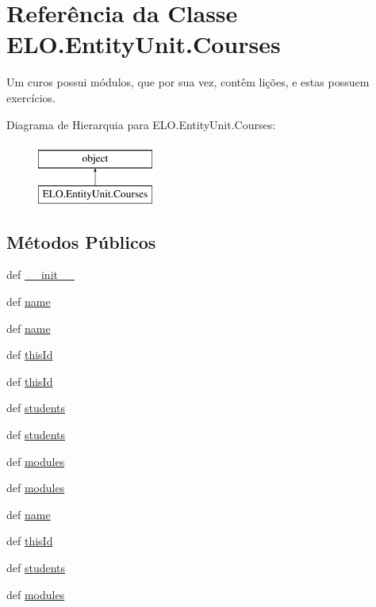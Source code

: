 \hypertarget{classELO_1_1EntityUnit_1_1Courses}{\section{Referência da Classe E\-L\-O.\-Entity\-Unit.\-Courses}
\label{classELO_1_1EntityUnit_1_1Courses}
}


Um curos possui módulos, que por sua vez, contêm lições, e estas possuem exercícios.  


Diagrama de Hierarquia para E\-L\-O.\-Entity\-Unit.\-Courses\-:\begin{figure}[H]
\begin{center}
\leavevmode
\includegraphics[height=2.000000cm]{d2/dc4/classELO_1_1EntityUnit_1_1Courses}
\end{center}
\end{figure}
\subsection*{Métodos Públicos}
\begin{DoxyCompactItemize}
\item 
def \hyperlink{classELO_1_1EntityUnit_1_1Courses_a8e8a964217e8e2b76c3ebd889ed8ae1e}{\-\_\-\-\_\-init\-\_\-\-\_\-}
\item 
def \hyperlink{classELO_1_1EntityUnit_1_1Courses_a7b502c0d94108e3c474e5a0e2842cc1d}{name}
\item 
def \hyperlink{classELO_1_1EntityUnit_1_1Courses_a7b502c0d94108e3c474e5a0e2842cc1d}{name}
\item 
def \hyperlink{classELO_1_1EntityUnit_1_1Courses_a079f341a80c13005aec8764266f5c2f2}{this\-Id}
\item 
def \hyperlink{classELO_1_1EntityUnit_1_1Courses_a079f341a80c13005aec8764266f5c2f2}{this\-Id}
\item 
def \hyperlink{classELO_1_1EntityUnit_1_1Courses_ab1a0895decc2986339e0ab148922ad61}{students}
\item 
def \hyperlink{classELO_1_1EntityUnit_1_1Courses_ab1a0895decc2986339e0ab148922ad61}{students}
\item 
def \hyperlink{classELO_1_1EntityUnit_1_1Courses_a5d791876c321c20f5a698273613d0d01}{modules}
\item 
def \hyperlink{classELO_1_1EntityUnit_1_1Courses_a5d791876c321c20f5a698273613d0d01}{modules}
\item 
def \hyperlink{classELO_1_1EntityUnit_1_1Courses_a7b502c0d94108e3c474e5a0e2842cc1d}{name}
\item 
def \hyperlink{classELO_1_1EntityUnit_1_1Courses_a079f341a80c13005aec8764266f5c2f2}{this\-Id}
\item 
def \hyperlink{classELO_1_1EntityUnit_1_1Courses_ab1a0895decc2986339e0ab148922ad61}{students}
\item 
def \hyperlink{classELO_1_1EntityUnit_1_1Courses_a5d791876c321c20f5a698273613d0d01}{modules}
\end{DoxyCompactItemize}
